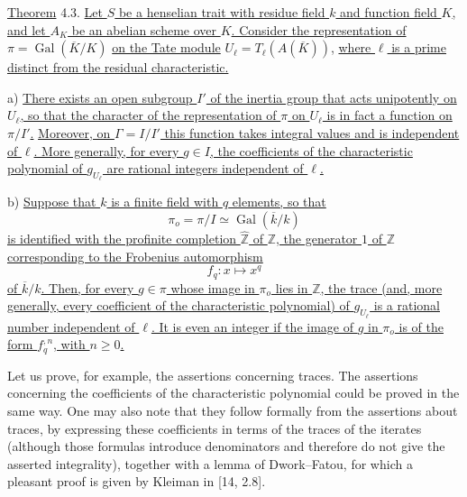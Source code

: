 
\medskip
\noindent
\underline{Theorem} 4.3. \underline{Let $S$ be a henselian trait with
residue field $k$ and function field $K$, and let $A_K$ be an abelian
scheme over $K$.  Consider the representation of}
$\pi=\operatorname{Gal}(\overline K/K)$ \underline{on the Tate module}
$U_\ell=T_\ell(A(\overline K))$, \underline{where $\ell$ is a prime
distinct from the residual characteristic.}

\smallskip
\noindent
a) \underline{There exists an open subgroup $I'$ of the inertia group
that acts unipotently on $U_\ell$, so that the character of the
representation of $\pi$ on $U_\ell$ is in fact a function on $\pi/I'$.}
\underline{Moreover, on $\Gamma=I/I'$ this function takes integral
values and is independent of $\ell$.  More generally, for every $g\in I$,
the coefficients of the characteristic polynomial of $g_{U_\ell}$ are
rational integers independent of $\ell$.}

\smallskip
\noindent
b) \underline{Suppose that $k$ is a finite field with $q$ elements, so
that}
\[
 \pi_o=\pi/I\simeq\operatorname{Gal}(\overline k/k)
\]
\underline{is identified with the profinite completion $\widehat{\mathbb
Z}$ of $\mathbb Z$, the generator $1$ of $\mathbb Z$ corresponding to
the Frobenius automorphism}
\[
 f_q:x\longmapsto x^q
\]
\underline{of $\overline k/k$.  Then, for every $g\in\pi$ whose image in
$\pi_o$ lies in $\mathbb Z$, the trace (and, more generally, every
coefficient of the characteristic polynomial) of $g_{U_\ell}$ is a
rational number independent of $\ell$.  It is even an integer if the
image of $g$ in $\pi_o$ is of the form $f_q^{,n}$, with $n\geq0$.}

Let us prove, for example, the assertions concerning traces.  The
assertions concerning the coefficients of the characteristic polynomial
could be proved in the same way.  One may also note that they follow
formally from the assertions about traces, by expressing these
coefficients in terms of the traces of the iterates (although those
formulas introduce denominators and therefore do not give the asserted
integrality), together with a lemma of Dwork--Fatou, for which a pleasant
proof is given by Kleiman in [14, 2.8].

